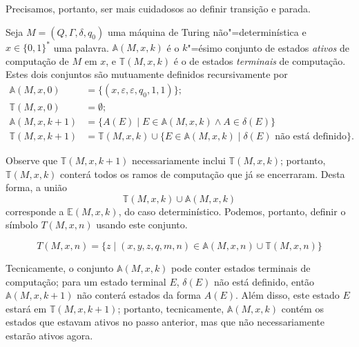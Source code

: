 Precisamos,
portanto,
ser mais cuidadosos ao definir transição e parada.

\begin{definition}
    Seja $M = (Q, \Gamma, \delta, q_0)$ uma máquina de Turing não"=determinística
    e $x \in \{0, 1\}^*$ uma palavra.
    $\mathbb A(M, x, k)$ é o $k$"=ésimo conjunto de estados
    \emph{ativos} de computação de $M$ em $x$,
    e $\mathbb T(M, x, k)$ é o de estados \emph{terminais} de computação.
    Estes dois conjuntos são mutuamente definidos recursivamente por
    \begin{align*}
        \mathbb A(M, x, 0) &= \{ (x, \varepsilon, \varepsilon, q_0, 1, 1) \}; \\
        \mathbb T(M, x, 0) &= \emptyset; \\
        \mathbb A(M, x, k+1) &= \{
            A(E) \mid E \in \mathbb A(M, x, k) \wedge
            A \in \delta(E)
        \} \\
        \mathbb T(M, x, k+1) &= \mathbb T(M, x, k) \cup \{
            E \in \mathbb A(M, x, k) \mid \text{$\delta(E)$ não está definido}
        \}.
    \end{align*}
\end{definition}

Observe que $\mathbb T(M, x, k+1)$ necessariamente inclui $\mathbb T(M, x, k)$;
portanto, $\mathbb T(M, x, k)$ conterá todos os ramos de computação
que já se encerraram.
Desta forma,
a união
\begin{equation*}
    \mathbb T(M, x, k) \cup \mathbb A(M, x, k)
\end{equation*}
corresponde a $\mathbb E(M, x, k)$, do caso determinístico.
Podemos,
portanto,
definir o símbolo $T(M, x, n)$ usando este conjunto.

\begin{definition}
    \begin{equation*}
        T(M, x, n) = \{
            z \mid (x, y, z, q, m, n) \in \mathbb A(M, x, n) \cup \mathbb T(M, x, n)
        \}
    \end{equation*}
\end{definition}

Tecnicamente,
o conjunto $\mathbb A(M, x, k)$ pode conter estados terminais de computação;
para um estado terminal $E$, $\delta(E)$ não está definido,
então $\mathbb A(M, x, k+1)$ não conterá estados da forma $A(E)$.
Além disso,
este estado $E$ estará em $\mathbb T(M, x, k+1)$;
portanto,
tecnicamente, $\mathbb A(M, x, k)$
contém os estados que estavam ativos no passo anterior,
mas que não necessariamente estarão ativos agora.

